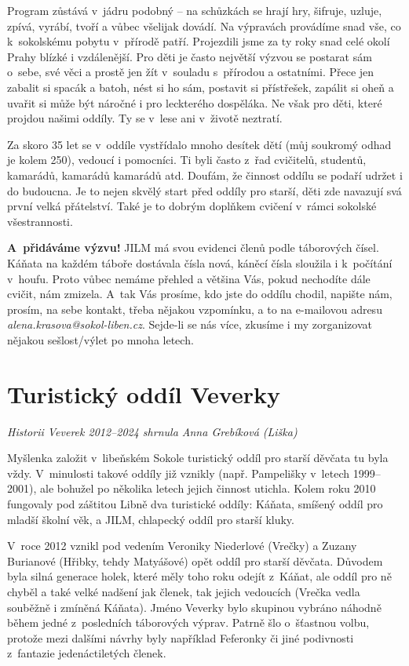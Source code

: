 \documentclass[a5paper, 12pt, twoside]{article}
\begin{document}
Program zůstává v~jádru podobný -- na schůzkách se hrají hry, šifruje,
uzluje, zpívá, vyrábí, tvoří a vůbec všelijak dovádí. Na výpravách
provádíme snad vše, co k~sokolskému pobytu v~přírodě patří. Projezdili
jsme za ty roky snad celé okolí Prahy blízké i vzdálenější. Pro děti je
často největší výzvou se postarat sám o~sebe, své věci a prostě jen žít
v~souladu s~přírodou a ostatními. Přece jen zabalit si spacák a batoh,
nést si ho sám, postavit si přístřešek, zapálit si oheň a uvařit si může
být náročné i pro leckterého dospěláka. Ne však pro děti, které projdou
našimi oddíly. Ty se v~lese ani v~životě neztratí.

Za skoro 35 let se v~oddíle vystřídalo mnoho desítek dětí (můj soukromý
odhad je kolem 250), vedoucí i pomocníci. Ti byli často z~řad cvičitelů,
studentů, kamarádů, kamarádů kamarádů atd. Doufám, že činnost oddílu se
podaří udržet i do budoucna. Je to nejen skvělý start před oddíly pro
starší, děti zde navazují svá první velká přátelství. Také je to dobrým
doplňkem cvičení v~rámci sokolské všestrannosti.

\textbf{A~přidáváme výzvu!} JILM má svou evidenci členů podle táborových
čísel. Káňata na každém táboře dostávala čísla nová, káněcí čísla
sloužila i k~počítání v~houfu. Proto vůbec nemáme přehled a většina Vás,
pokud nechodíte dále cvičit, nám zmizela. A~tak Vás prosíme, kdo jste do
oddílu chodil, napište nám, prosím, na sebe kontakt, třeba nějakou
vzpomínku, a to na e-mailovou adresu
\textit{alena.krasova@sokol-liben.cz}. Sejde-li se nás více, zkusíme
i my zorganizovat nějakou sešlost/výlet po mnoha letech.

\section{Turistický oddíl Veverky}

\textit{Historii Veverek 2012--2024 shrnula Anna Grebíková (Liška)}

Myšlenka založit v~libeňském Sokole turistický oddíl pro starší děvčata
tu byla vždy. V~minulosti takové oddíly již vznikly (např. Pampelišky
v~letech 1999--2001), ale bohužel po několika letech jejich činnost
utichla. Kolem roku 2010 fungovaly pod záštitou Libně dva turistické
oddíly: Káňata, smíšený oddíl pro mladší školní věk, a JILM, chlapecký
oddíl pro starší kluky.

V~roce 2012 vznikl pod vedením Veroniky Niederlové (Vrečky) a Zuzany
Burianové (Hřibky, tehdy Matyášové) opět oddíl pro starší děvčata.
Důvodem byla silná generace holek, které měly toho roku odejít z~Káňat,
ale oddíl pro ně chyběl a také velké nadšení jak členek, tak jejich
vedoucích (Vrečka vedla souběžně i zmíněná Káňata). Jméno Veverky bylo
skupinou vybráno náhodně během jedné z~posledních táborových výprav.
Patrně šlo o~šťastnou volbu, protože mezi dalšími návrhy byly například
Feferonky či jiné podivnosti z~fantazie jedenáctiletých členek.
\end{document}

